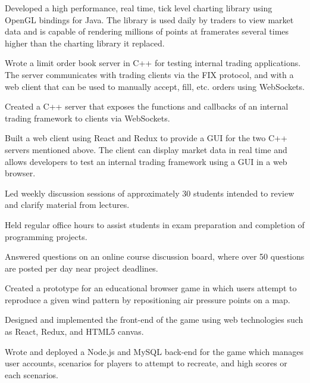 \documentclass[10pt]{article}
\begin{document}

\begin{bullets}
  \item Developed a high performance, real time, tick level charting library using OpenGL bindings for Java.
        The library is used daily by traders to view market data and is capable of rendering millions of points
        at framerates several times higher than the charting library it replaced.
  \item Wrote a limit order book server in C++ for testing internal trading applications. The server communicates
        with trading clients via the FIX protocol, and with a web client that can be used to manually accept, fill,
        etc. orders using WebSockets.
  \item Created a C++ server that exposes the functions and callbacks of an internal trading framework to clients
        via WebSockets.
  \item Built a web client using React and Redux to provide a GUI for the two C++ servers mentioned above. The client
        can display market data in real time and allows developers to test an internal trading framework using a GUI
        in a web browser.
\end{bullets}

\begin{bullets}
  \item Led weekly discussion sessions of approximately 30 students intended to review and clarify material
        from lectures.
  \item Held regular office hours to assist students in exam preparation and completion of programming projects.
  \item Answered questions on an online course discussion board, where over 50 questions are posted per day
        near project deadlines.
\end{bullets}

\begin{bullets}
  \item Created a prototype for an educational browser game in which users attempt to reproduce a given wind
        pattern by repositioning air pressure points on a map.
  \item Designed and implemented the front-end of the game using web technologies such as React, Redux, and
        HTML5 canvas.
  \item Wrote and deployed a Node.js and MySQL back-end for the game which manages user accounts, scenarios
        for players to attempt to recreate, and high scores or each scenarios.
\end{bullets}
\end{document}
